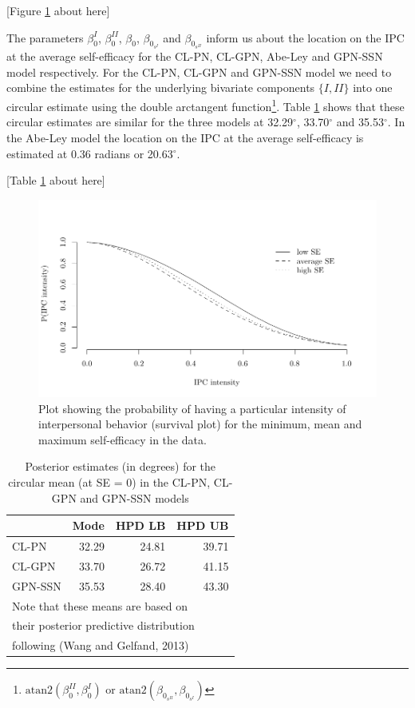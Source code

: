 \documentclass[man,mask]{apa6}
\let\rmarkdownfootnote\footnote%
\def\footnote{\protect\rmarkdownfootnote}
\begin{document}
\hfil \hspace{2cm} {[}Figure \ref{reglineweib} about here{]} \hfil

\indent The parameters \(\beta_0^{I}\), \(\beta_0^{II}\), \(\beta_0\),
\(\beta_{0_{s^{I}}}\) and \(\beta_{0_{s^{II}}}\) inform us about the location on the IPC at the average self-efficacy for the CL-PN, CL-GPN,
Abe-Ley and GPN-SSN model respectively. For the CL-PN, CL-GPN and GPN-SSN model
we need to combine the estimates for the underlying bivariate components \(\{I, II\}\) into one circular estimate using the double arctangent
function\footnote{\(\mbox{atan2}(\beta_0^{II}, \beta_0^{I})\) or
\(\mbox{atan2}(\beta_{0_{s^{II}}}, \beta_{0_{s^{I}}})\)}.
Table \ref{tab:means} shows that these circular estimates are similar for the
three models at 32.29\(^\circ\), 33.70\(^\circ\) and 35.53\(^\circ\). In the Abe-Ley
model the location on the IPC at the average self-efficacy is
estimated at 0.36 radians or 20.63\(^\circ\).

\hfil \hspace{2cm} {[}Table \ref{tab:means} about here{]} \hfil

\begin{figure}
\centering
\includegraphics[width = \textwidth]{Plots/survivaldiffSE.pdf}
\caption{Plot showing the probability of having a particular intensity of interpersonal behavior (survival plot) for the minimum, mean and maximum self-efficacy in the data.}
\label{reglineweib}
\end{figure}

\begin{table}
\caption{\label{tab:means}Posterior estimates (in degrees) for the circular mean (at SE = 0) in the CL-PN, CL-GPN and GPN-SSN models}
\centering
\begin{tabular}[t]{lrrr}
\toprule
  & Mode & HPD LB & HPD UB\\
  \midrule
CL-PN & 32.29 & 24.81 & 39.71\\
CL-GPN & 33.70 & 26.72 & 41.15\\
GPN-SSN & 35.53 & 28.40 & 43.30\\
\bottomrule
\multicolumn{4}{l}{Note that these means are based on}\\
\multicolumn{4}{l}{their posterior predictive distribution }\\
\multicolumn{4}{l}{following (Wang and Gelfand, 2013)}\\
\end{tabular}
\end{table}
\end{document}
